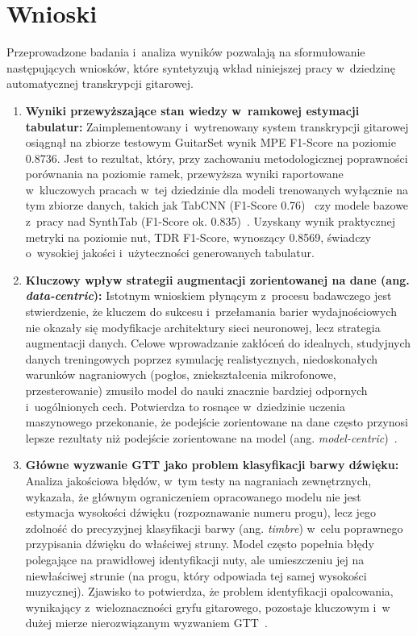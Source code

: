 \section{Wnioski}
\label{sec:wnioski_koncowe}

Przeprowadzone badania i~analiza wyników pozwalają na sformułowanie następujących wniosków, które syntetyzują wkład niniejszej pracy w~dziedzinę automatycznej transkrypcji gitarowej.

\begin{enumerate}
    \item \textbf{Wyniki przewyższające stan wiedzy w~ramkowej estymacji tabulatur:} Zaimplementowany i~wytrenowany system transkrypcji gitarowej osiągnął na zbiorze testowym GuitarSet wynik MPE F1-Score na poziomie 0.8736. Jest to rezultat, który, przy zachowaniu metodologicznej poprawności porównania na poziomie ramek, przewyższa wyniki raportowane w~kluczowych pracach w~tej dziedzinie dla modeli trenowanych wyłącznie na tym zbiorze danych, takich jak TabCNN (F1-Score 0.76)~\autocite{Wiggins2019TabCNN} czy modele bazowe z~pracy nad SynthTab (F1-Score ok. 0.835)~\autocite{Zang2023SynthTab}. Uzyskany wynik praktycznej metryki na poziomie nut, TDR F1-Score, wynoszący 0.8569, świadczy o~wysokiej jakości i~użyteczności generowanych tabulatur.

    \item \textbf{Kluczowy wpływ strategii augmentacji zorientowanej na dane (ang. \textit{data-centric}):} Istotnym wnioskiem płynącym z~procesu badawczego jest stwierdzenie, że kluczem do sukcesu i~przełamania barier wydajnościowych nie okazały się modyfikacje architektury sieci neuronowej, lecz strategia augmentacji danych. Celowe wprowadzanie zakłóceń do idealnych, studyjnych danych treningowych poprzez symulację realistycznych, niedoskonałych warunków nagraniowych (pogłos, zniekształcenia mikrofonowe, przesterowanie) zmusiło model do nauki znacznie bardziej odpornych i~uogólnionych cech. Potwierdza to rosnące w~dziedzinie uczenia maszynowego przekonanie, że podejście zorientowane na dane często przynosi lepsze rezultaty niż podejście zorientowane na model (ang. \textit{model-centric})~\autocite{Jamshidi2024SurveyAMT}.

    \item \textbf{Główne wyzwanie GTT jako problem klasyfikacji barwy dźwięku:} Analiza jakościowa błędów, w~tym testy na nagraniach zewnętrznych, wykazała, że głównym ograniczeniem opracowanego modelu nie jest estymacja wysokości dźwięku (rozpoznawanie numeru progu), lecz jego zdolność do precyzyjnej klasyfikacji barwy (ang. \textit{timbre}) w~celu poprawnego przypisania dźwięku do właściwej struny. Model często popełnia błędy polegające na prawidłowej identyfikacji nuty, ale umieszczeniu jej na niewłaściwej strunie (na progu, który odpowiada tej samej wysokości muzycznej). Zjawisko to potwierdza, że problem identyfikacji opalcowania, wynikający z~wieloznaczności gryfu gitarowego, pozostaje kluczowym i~w dużej mierze nierozwiązanym wyzwaniem GTT~\autocite{Wiggins2019TabCNN}.


\end{enumerate}
